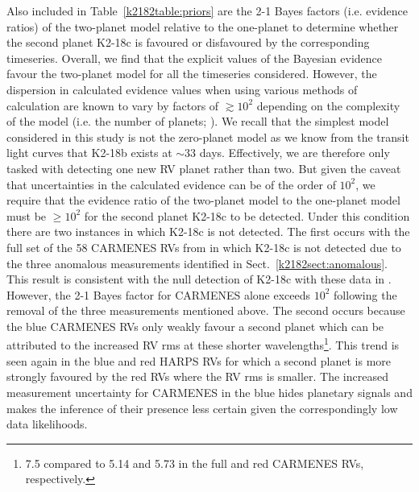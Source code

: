 Also included in Table~\ref{k2182table:priors} are the 2-1 Bayes factors (i.e. evidence ratios) of the
two-planet model relative to the one-planet to determine whether the second planet K2-18c is favoured or disfavoured by the
corresponding timeseries. Overall, we find that the explicit values of the Bayesian
evidence favour the two-planet model for {all} the timeseries considered. However, the dispersion in calculated
evidence values when using various methods of calculation are known to vary by factors of $\gtrsim 10^2$
depending on the complexity of the model (i.e. the number of planets; \citealt{nelson18}). We recall that the
simplest model considered in this study is not the zero-planet model as we know from the transit light curves
that K2-18b exists at $\sim 33$ days. Effectively, we are therefore only tasked with detecting one new RV planet
rather than two. But given the caveat that uncertainties in the calculated evidence
can be of the order of $10^2$, we require that the evidence ratio of the two-planet model to the one-planet model must
be $\geq 10^2$ for the second planet K2-18c to be detected. Under this condition there are two instances
in which K2-18c is not detected. The first occurs with the full set of the 58 CARMENES RVs from
 in which K2-18c is not detected due to the three anomalous measurements identified
in Sect.~\ref{k2182sect:anomalous}. This result is consistent with the null detection of K2-18c with these data
in . However, the 2-1 Bayes factor for CARMENES alone exceeds $10^2$ following the
removal of the three  measurements mentioned above. The second occurs because  the blue CARMENES RVs only weakly favour a
second planet which can be attributed to the increased RV rms at these shorter wavelengths\footnote{
  7.5 \mps{} compared to 5.14 and 5.73 \mps{} in the full and red CARMENES RVs, respectively.}. This trend
is seen again in the blue and red HARPS RVs for which a second planet is more strongly favoured
by the red RVs where the RV rms is smaller. The increased measurement uncertainty for CARMENES in the
blue hides planetary signals and makes the inference of their presence less certain given
the correspondingly low data likelihoods. \\



